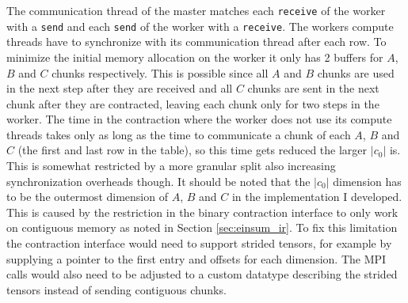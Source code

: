 The communication thread of the master matches each \texttt{receive} of the worker with a \texttt{send} and each \texttt{send} of the worker with a \texttt{receive}.
The workers compute threads have to synchronize with its communication thread after each row.
To minimize the initial memory allocation on the worker it only has 2 buffers for $A$, $B$ and $C$ chunks respectively.
This is possible since all $A$ and $B$ chunks are used in the next step after they are received and all $C$ chunks are sent in the next chunk after they are contracted, leaving each chunk only for two steps in the worker.
The time in the contraction where the worker does not use its compute threads takes only as long as the time to communicate a chunk of each $A$, $B$ and $C$ (the first and last row in the table), so this time gets reduced the larger $|c_0|$ is.
This is somewhat restricted by a more granular split also increasing synchronization overheads though.
It should be noted that the $|c_0|$ dimension has to be the outermost dimension of $A$, $B$ and $C$ in the implementation I developed.
This is caused by the restriction in the binary contraction interface to only work on contiguous memory as noted in Section \ref{sec:einsum_ir}.
To fix this limitation the contraction interface would need to support strided tensors, for example by supplying a pointer to the first entry and offsets for each dimension.
The MPI calls would also need to be adjusted to a custom datatype describing the strided tensors instead of sending contiguous chunks.
